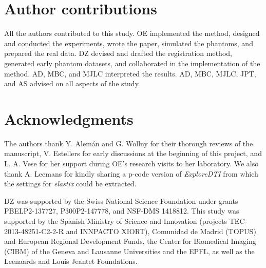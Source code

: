 \section*{Author contributions}
All the authors contributed to this study.
OE implemented the method, designed and conducted the experiments, wrote the paper,
  simulated the phantoms, and prepared the real data.
DZ devised and drafted the registration method, generated early phantom datasets, and
  collaborated in the implementation of the method.
AD, MBC, and MJLC interpreted the results.
AD, MBC, MJLC, JPT, and AS advised on all aspects of the study.

\section*{Acknowledgments}
The authors thank Y. Alem\'an and G. Wollny for their thorough reviews of the manuscript,
  V. Estellers for early discussions at the beginning of this project,
  and L. A. Vese for her support during OE's research visits to her laboratory.
We also thank A. Leemans for kindly sharing a p-code version of \emph{ExploreDTI} from
  which the settings for \emph{elastix} could be extracted.

DZ was supported by the Swiss National Science Foundation under grants PBELP2-137727, 
  P300P2-147778, and NSF-DMS 1418812.
This study was supported by the Spanish Ministry of Science and Innovation
  (projects TEC-2013-48251-C2-2-R and INNPACTO XIORT), Comunidad de Madrid (TOPUS) and
  European Regional Development Funds, the Center for Biomedical Imaging
  (CIBM) of the Geneva and Lausanne Universities and the EPFL, as well as the
  Leenaards and Louis Jeantet Foundations.